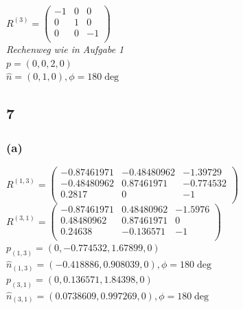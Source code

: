 \documentclass{../Vorlage/mat}
\begin{document}
$R^{(3)} = \begin{pmatrix}
-1 & 0 & 0 \\
0 & 1 & 0\\
0 & 0 & -1\\
\end{pmatrix}
$\\
\textit{Rechenweg wie in Aufgabe 1}\\
$p = \left(0,0,2,0\right)$\\
$\hat{n} =(0,1,0) , \phi = 180\deg$


\subsection*{7}
\subsubsection*{(a)}
$R^{(1,3)} = \begin{pmatrix}
	-0.87461971 & -0.48480962 & -1.39729 \\
	-0.48480962 & 0.87461971 & -0.774532 \\
	0.2817 & 0 & -1 \\
	\end{pmatrix}$\\
$R^{(3,1)} = \begin{pmatrix}
	-0.87461971 & 0.48480962 & -1.5976\\
	0.48480962 & 0.87461971 & 0\\
	0.24638 & -0.136571 & -1\\
\end{pmatrix}$\\
$p_{(1,3)} = (0, -0.774532, 1.67899, 0)$\\
$\hat{n}_{(1,3)} = (-0.418886, 0.908039, 0) , \phi = 180\deg$\\

$p_{(3,1)} = (0, 0.136571, 1.84398, 0)$\\
$\hat{n}_{(3,1)} = (0.0738609, 0.997269, 0) , \phi = 180\deg$\\



	
\end{document}
